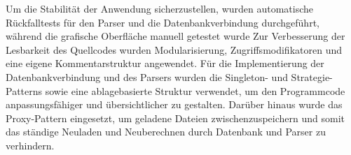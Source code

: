 	\newline%
	Um die Stabilität der Anwendung sicherzustellen, wurden automatische Rückfalltests für den Parser und die Datenbankverbindung durchgeführt, während die grafische Oberfläche manuell getestet wurde %
	Zur Verbesserung der Lesbarkeit des Quellcodes wurden Modularisierung, Zugriffsmodifikatoren und eine eigene Kommentarstruktur angewendet.%
	\newline
	Für die Implementierung der Datenbankverbindung und des Parsers wurden die Singleton- und Strategie-Patterns sowie eine ablagebasierte Struktur verwendet, um den Programmcode anpassungsfähiger und übersichtlicher zu gestalten. Darüber hinaus wurde das Proxy-Pattern eingesetzt, um geladene Dateien zwischenzuspeichern und somit das ständige Neuladen und Neuberechnen durch Datenbank und Parser zu verhindern.%
%
%
%
%
%
%
%
%
